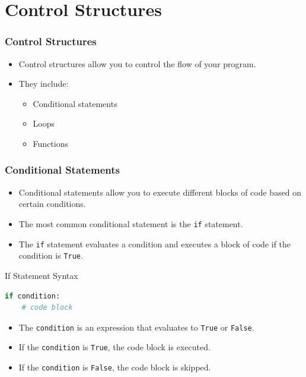\documentclass{beamer}
\begin{document}
\section{Control Structures}
\begin{frame}
    \frametitle{Control Structures}
    \begin{itemize}
        \item Control structures allow you to control the flow of your program.
        \item They include:
        \begin{itemize}
            \item Conditional statements
            \item Loops
            \item Functions
        \end{itemize}
    \end{itemize}
\end{frame}
\begin{frame}
    \frametitle{Conditional Statements}
    \begin{itemize}
        \item Conditional statements allow you to execute different blocks of code based on certain conditions.
        \item The most common conditional statement is the \texttt{if} statement.
        \item The \texttt{if} statement evaluates a condition and executes a block of code if the condition is \texttt{True}.
    \end{itemize}
\end{frame}

\begin{frame}[fragile]{If Statement Syntax}
    \begin{lstlisting}[style=colorful, language=Python]
if condition:
    # code block
    \end{lstlisting}
    \begin{itemize}
        \item The \texttt{condition} is an expression that evaluates to \texttt{True} or \texttt{False}.
        \item If the \texttt{condition} is \texttt{True}, the code block is executed.
        \item If the \texttt{condition} is \texttt{False}, the code block is skipped.
    \end{itemize}
\end{frame}
\end{document}
